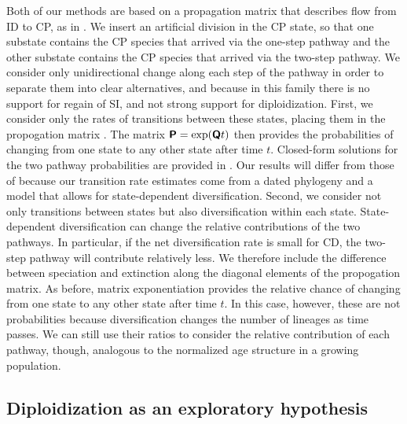 Both of our methods are based on a propagation matrix that describes flow from ID to CP, as in \citet{robertson_2011}.
We insert an artificial division in the CP state, so that one substate contains the CP species that arrived via the one-step pathway and the other substate contains the CP species that arrived via the two-step pathway.
We consider only unidirectional change along each step of the pathway in order to separate them into clear alternatives, and because in this family there is no support for regain of SI, and not strong support for diploidization.
First, we consider only the rates of transitions between these states, placing them in the propogation matrix .
The matrix $\bm{\mathsf{P}} = \exp(\bm{\mathsf{Q}} t)$ then provides the probabilities of changing from one state to any other state after time $t$.
Closed-form solutions for the two pathway probabilities are provided in \citet{robertson_2011}.
Our results will differ from those of \citet{robertson_2011} because our transition rate estimates come from a dated phylogeny and a model that allows for state-dependent diversification.
%
Second, we consider not only transitions between states but also diversification within each state.
State-dependent diversification can change the relative contributions of the two pathways.
In particular, if the net diversification rate is small for CD, the two-step pathway will contribute relatively less.
We therefore include the difference between speciation and extinction along the diagonal elements of the propogation matrix.
As before, matrix exponentiation provides the relative chance of changing from one state to any other state after time $t$.
In this case, however, these are not probabilities because diversification changes the number of lineages as time passes.
We can still use their ratios to consider the relative contribution of each pathway, though, analogous to the normalized age structure in a growing population. %



\subsection{Diploidization as an exploratory hypothesis}

